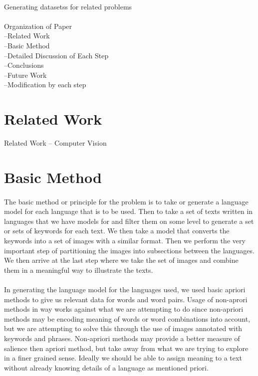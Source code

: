 \documentclass[12pt]{article}
\begin{document}
\paragraph{}
Generating datasetss for related problems
\paragraph{}
Organization of Paper \\
--Related Work \\
--Basic Method \\
--Detailed Discussion of Each Step \\
--Conclusions \\
--Future Work \\
--Modification by each step \\

\section{Related Work}
Related Work
-- Computer Vision

\section{Basic Method}
\paragraph{}
The basic method or principle for the problem is to take or generate a language model for
each language that is to be used. Then to take a set of texts written in languages that we
have models for and filter them on some level to generate a set or sets of keywords for each
text. We then take a model that converts the keywords into a set of images with a similar
format. Then we perform the very important step of partitioning the images into subsections
between the languages. We then arrive at the last step where we take the set of images and
combine them in a meaningful way to illustrate the texts.
\paragraph{}
In generating the language model for the languages used, we used basic apriori methods to
give us relevant data for words and word pairs. Usage of non-aprori methods in way works
against what we are attempting to do since non-apriori methods may be encoding meaning
of words or word combinations into account, but we are attempting to solve this through
the use of images annotated with keywords and phrases. Non-apriori methods may provide
a better measure of salience then apriori method, but take away from what we are trying
to explore in a finer grained sense. Ideally we should be able to assign meaning to a text
without already knowing details of a language as mentioned priori.
\end{document}
